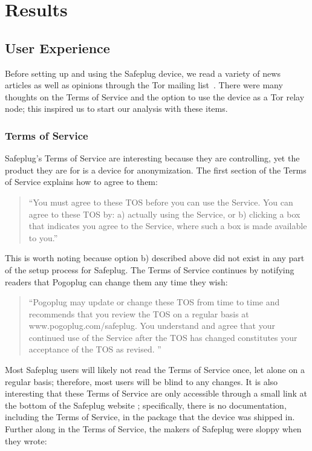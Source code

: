 \section{Results}
\label{sec:results}
\subsection{User Experience}
\label{sec:ux}

Before setting up and using the Safeplug device, we read a variety of news articles as well as opinions through the Tor mailing list~\cite{tormailinglist}.  There were many thoughts on the Terms of Service and the option to use the device as a Tor relay node; this inspired us to start our analysis with these items.  

\subsubsection{Terms of Service}
Safeplug's Terms of Service are interesting because they are controlling, yet the product they are for is a device for anonymization.  The first section of the Terms of Service explains how to agree to them:

\begin{quotation}
``You must agree to these TOS before you can use the Service. You can agree to these TOS by: a) actually using the Service, or b) clicking a box that indicates you agree to the Service, where such a box is made available to you.'' \cite{safeplug}
\end{quotation}

This is worth noting because option b) described above did not exist in any part of the setup process for Safeplug.  The Terms of Service continues by notifying readers that Pogoplug can change them any time they wish:

\begin{quotation}
``Pogoplug may update or change these TOS from time to time and recommends that you review the TOS on a regular basis at www.pogoplug.com/safeplug. You understand and agree that your continued use of the Service after the TOS has changed constitutes your acceptance of the TOS as revised. '' \cite{safeplug}
\end{quotation}

Most Safeplug users will likely not read the Terms of Service once, let alone on a regular basis; therefore, most users will be blind to any changes.  It is also interesting that these Terms of Service are only accessible through a small link at the bottom of the Safeplug website \cite{safeplug}; specifically, there is no documentation, including the Terms of Service, in the package that the device was shipped in.  Further along in the Terms of Service, the makers of Safeplug were sloppy when they wrote:

